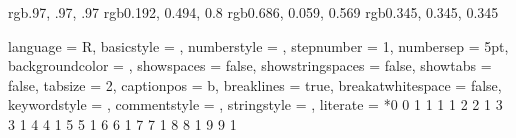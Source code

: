 
\geometry{verbose, tmargin = 2.5cm, bmargin = 2.5cm, lmargin = 2.5cm, rmargin = 2.5cm}

\definecolor{backgroundCol}  {rgb}{.97, .97, .97}
\definecolor{stringstyleCol} {rgb}{0.192, 0.494, 0.8}
\definecolor{NumCol}         {rgb}{0.686, 0.059, 0.569}
\definecolor{basicstyleCol}  {rgb}{0.345, 0.345, 0.345}

{
    language = R,                                        %
    basicstyle = \small \ttfamily \color{basicstyleCol}, %
    numberstyle = \color{green},                         %
    stepnumber = 1,                                      %
    numbersep = 5pt,                                     %
    backgroundcolor = \color{backgroundCol},             %
    showspaces = false,                                  %
    showstringspaces = false,                            %
    showtabs = false,                                    %
    tabsize = 2,                                         %
    captionpos = b,                                      %
    breaklines = true,                                   %
    breakatwhitespace = false,                           %
    keywordstyle = \color{keywordstyleCol},              %
    commentstyle = \color{commentstyleCol},              %
    stringstyle = \color{stringstyleCol},                %
    literate = %
    *{0}{{{\color{NumCol} 0}}} 1
     {1}{{{\color{NumCol} 1}}} 1
     {2}{{{\color{NumCol} 2}}} 1
     {3}{{{\color{NumCol} 3}}} 1
     {4}{{{\color{NumCol} 4}}} 1
     {5}{{{\color{NumCol} 5}}} 1
     {6}{{{\color{NumCol} 6}}} 1
     {7}{{{\color{NumCol} 7}}} 1
     {8}{{{\color{NumCol} 8}}} 1
     {9}{{{\color{NumCol} 9}}} 1
}

